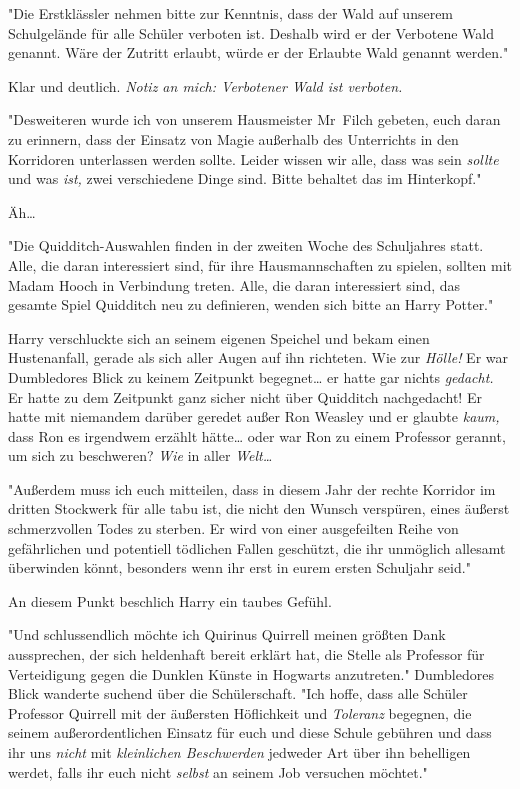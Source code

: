 {"Die Erstklässler nehmen bitte zur Kenntnis, dass der Wald auf unserem Schulgelände für alle Schüler verboten ist. Deshalb wird er der Verbotene Wald genannt. Wäre der Zutritt erlaubt, würde er der Erlaubte Wald genannt werden."

Klar und deutlich. \emph{Notiz an mich: Verbotener Wald ist verboten.}

"Desweiteren wurde ich von unserem Hausmeister Mr~Filch gebeten, euch daran zu erinnern, dass der Einsatz von Magie außerhalb des Unterrichts in den Korridoren unterlassen werden sollte. Leider wissen wir alle, dass was sein \emph{sollte} und was \emph{ist,} zwei verschiedene Dinge sind. Bitte behaltet das im Hinterkopf."

Äh…

"Die Quidditch-Auswahlen finden in der zweiten Woche des Schuljahres statt. Alle, die daran interessiert sind, für ihre Hausmannschaften zu spielen, sollten mit Madam Hooch in Verbindung treten. Alle, die daran interessiert sind, das gesamte Spiel Quidditch neu zu definieren, wenden sich bitte an Harry Potter."

Harry verschluckte sich an seinem eigenen Speichel und bekam einen Hustenanfall, gerade als sich aller Augen auf ihn richteten. Wie zur \emph{Hölle!} Er war Dumbledores Blick zu keinem Zeitpunkt begegnet… er hatte gar nichts \emph{gedacht.} Er hatte zu dem Zeitpunkt ganz sicher nicht über Quidditch nachgedacht! Er hatte mit niemandem darüber geredet außer Ron Weasley und er glaubte \emph{kaum,} dass Ron es irgendwem erzählt hätte… oder war Ron zu einem Professor gerannt, um sich zu beschweren? \emph{Wie} in aller \emph{Welt…}

"Außerdem muss ich euch mitteilen, dass in diesem Jahr der rechte Korridor im dritten Stockwerk für alle tabu ist, die nicht den Wunsch verspüren, eines äußerst schmerzvollen Todes zu sterben. Er wird von einer ausgefeilten Reihe von gefährlichen und potentiell tödlichen Fallen geschützt, die ihr unmöglich allesamt überwinden könnt, besonders wenn ihr erst in eurem ersten Schuljahr seid."

An diesem Punkt beschlich Harry ein taubes Gefühl.

"Und schlussendlich möchte ich Quirinus Quirrell meinen größten Dank aussprechen, der sich heldenhaft bereit erklärt hat, die Stelle als Professor für Verteidigung gegen die Dunklen Künste in Hogwarts anzutreten." Dumbledores Blick wanderte suchend über die Schülerschaft. "Ich hoffe, dass alle Schüler Professor Quirrell mit der äußersten Höflichkeit und \emph{Toleranz} begegnen, die seinem außerordentlichen Einsatz für euch und diese Schule gebühren und dass ihr uns \emph{nicht} mit \emph{kleinlichen Beschwerden} jedweder Art über ihn behelligen werdet, falls ihr euch nicht \emph{selbst} an seinem Job versuchen möchtet."

}
